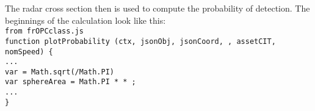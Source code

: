 \noindent The radar cross section then is used to compute the probability of detection.  The beginnings of the calculation look like this:\\

\indent\texttt{from frOPCclass.js} \\
\indent\texttt{function plotProbability (ctx, jsonObj, jsonCoord, {\color{blue}{xSection}}, assetCIT, nomSpeed) \{} \\
\indent\texttt{\quad \quad ...} \\
\indent\texttt{\quad var {\color{purple}{xSecRadius}}   = Math.sqrt({\color{blue}{xSection}}/Math.PI)} \\
\indent\texttt{\quad var sphereArea   = Math.PI * {\color{purple}{xSecRadius}} * {\color{purple}{xSecRadius}};} \\
\indent\texttt{\quad \quad ...} \\
\indent\texttt{\}}\\
%


\endinput  %
